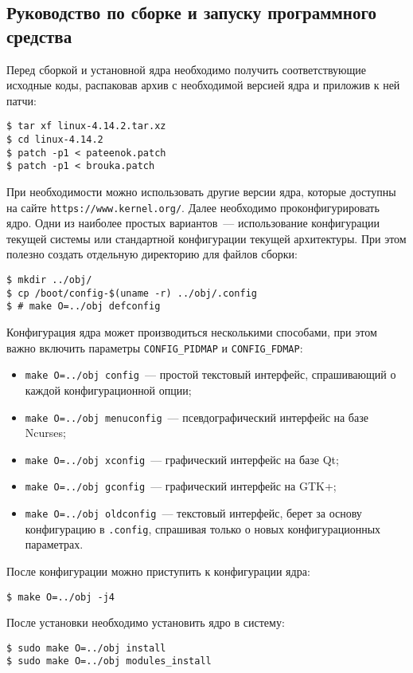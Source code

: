 \subsection{Руководство по сборке и запуску программного средства}

Перед сборкой и установной ядра необходимо получить соответствующие исходные
коды, распаковав архив с необходимой версией ядра и приложив к ней патчи:

\medskip
\begin{lstlisting}[style=cstyle]
$ tar xf linux-4.14.2.tar.xz
$ cd linux-4.14.2
$ patch -p1 < pateenok.patch
$ patch -p1 < brouka.patch
\end{lstlisting}
\medskip

При необходимости можно использовать другие версии ядра, которые доступны на
сайте \texttt{https://www.kernel.org/}. Далее необходимо проконфигурировать
ядро. Одни из наиболее простых вариантов~--- использование конфигурации текущей
системы или стандартной конфигурации текущей архитектуры. При этом полезно
создать отдельную директорию для файлов сборки:

\medskip
\begin{lstlisting}[style=cstyle]
$ mkdir ../obj/
$ cp /boot/config-$(uname -r) ../obj/.config
$ # make O=../obj defconfig
\end{lstlisting}
\medskip

Конфигурация ядра может производиться несколькими способами, при этом важно
включить параметры \texttt{CONFIG\_PIDMAP} и \texttt{CONFIG\_FDMAP}:
\begin{itemize}
\item \texttt{make O=../obj config}~--- простой текстовый интерфейс, спрашивающий о
  каждой конфигурационной опции;
\item \texttt{make O=../obj menuconfig}~--- псевдографический интерфейс на базе Ncurses;
\item \texttt{make O=../obj xconfig}~--- графический интерфейс на базе Qt;
\item \texttt{make O=../obj gconfig}~--- графический интерфейс на GTK+;
\item \texttt{make O=../obj oldconfig}~--- текстовый интерфейс, берет за основу
  конфигурацию в \texttt{.config}, спрашивая только о новых конфигурационных параметрах.
\end{itemize}

После конфигурации можно приступить к конфигурации ядра:
\medskip
\begin{lstlisting}[style=cstyle]
$ make O=../obj -j4
\end{lstlisting}
\medskip

После установки необходимо установить ядро в систему:
\medskip
\begin{lstlisting}[style=cstyle]
$ sudo make O=../obj install
$ sudo make O=../obj modules_install
\end{lstlisting}
\medskip
